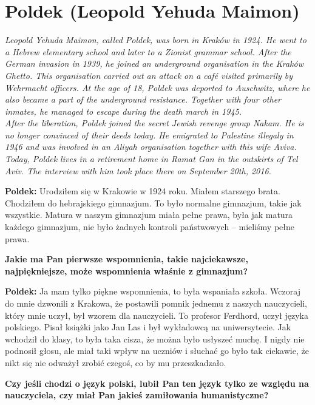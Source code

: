 \section{Poldek (Leopold Yehuda Maimon)}
\begin{otherlanguage}{polish}
\textit{Leopold Yehuda Maimon, called Poldek, was born in Kraków in 1924. He went to a Hebrew elementary school and later to a Zionist grammar school. After the German invasion in 1939, he joined an underground organisation in the Kraków Ghetto. This organisation carried out an attack on a café visited primarily by Wehrmacht officers. At the age of 18, Poldek was deported to Auschwitz, where he also became a part of the underground resistance. Together with four other inmates, he managed to escape during the death march in 1945.\\
After the liberation, Poldek joined the secret Jewish revenge group Nakam. He is no longer convinced of their deeds today. He emigrated to Palestine illegaly in 1946 and was involved in an Aliyah organisation together with this wife Aviva. Today, Poldek lives in a retirement home in Ramat Gan in the outskirts of Tel Aviv. The interview with him took place there on September 20th, 2016.}\par
\vspace*{2em}
\textbf{Poldek:} Urodziłem się w Krakowie w 1924 roku. Miałem starszego brata. Chodziłem do hebrajskiego gimnazjum. To było normalne gimnazjum, takie jak wszystkie. Matura w naszym gimnazjum miała pełne prawa, była jak matura każdego gimnazjum, nie było żadnych kontroli państwowych – mieliśmy pełne prawa.

\textbf{Jakie ma Pan pierwsze wspomnienia, takie najciekawsze, najpiękniejsze, może wspomnienia właśnie z gimnazjum?}

\textbf{Poldek:} Ja mam tylko piękne wspomnienia, to była wspaniała szkoła. Wczoraj do mnie dzwonili z Krakowa, że postawili pomnik jednemu z naszych nauczycieli, który mnie uczył, był wzorem dla nauczycieli. To profesor Ferdhord, uczył języka polskiego. Pisał książki jako Jan Las i był wykładowcą na uniwersytecie. Jak wchodził do klasy, to była taka cisza, że można było usłyszeć muchę. I nigdy nie podnosił głosu, ale miał taki wpływ na uczniów i słuchać go było tak ciekawie, że nikt się nie odważył zrobić czegoś, co by mu przeszkadzało. 

\textbf{Czy jeśli chodzi o język polski, lubił Pan ten język tylko ze względu na nauczyciela, czy miał Pan jakieś zamiłowania humanistyczne?}
 

\end{otherlanguage}
